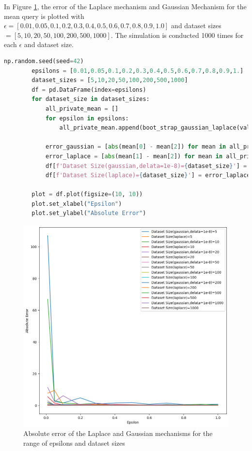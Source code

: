 \documentclass[12pt]{extarticle}
\begin{document}
	 In Figure \ref{fig:fig10}, the error of the Laplace mechanism and Gaussian Mechanism for the mean query is plotted with $\epsilon = [0.01, 0.05, 0.1, 0.2, 0.3, 0.4, 0.5, 0.6, 0.7, 0.8, 0.9, 1.0]$ and dataset sizes $=[5, 10, 20, 50, 100, 200, 500, 1000]$. The simulation is conducted 1000 times for each $\epsilon$ and dataset size.
	 \begin{lstlisting}[language=Python]
	 	np.random.seed(seed=42)
	 	epsilons = [0.01,0.05,0.1,0.2,0.3,0.4,0.5,0.6,0.7,0.8,0.9,1.]
	 	dataset_sizes = [5,10,20,50,100,200,500,1000]
	 	df = pd.DataFrame(index=epsilons)
	 	for dataset_size in dataset_sizes:
	 		all_private_mean = []
		 	for epsilon in epsilons:
		 		all_private_mean.append(boot_strap_gaussian_laplace(val,pmf,epsilon,dataset_size,simulation_number=1000))
		 	
		 	error_gaussian = [abs(mean[0] - mean[2]) for mean in all_private_mean]
		 	error_laplace = [abs(mean[1] - mean[2]) for mean in all_private_mean]
		 	df[f'Dataset Size(gaussian,delata=1e-8)={dataset_size}'] = error_gaussian
		 	df[f'Dataset Size(laplace)={dataset_size}'] = error_laplace
	 	
	 	plot = df.plot(figsize=(10, 10))
	 	plot.set_xlabel("Epsilon")
	 	plot.set_ylabel("Absolute Error")
	 \end{lstlisting}
	\begin{figure}[h]
	\centering
	\includegraphics[width=1\textwidth]{im10.png}
	\caption{Absolute error of the Laplace and Gaussian mechanisms for the range of epsilons and dataset sizes}
	\label{fig:fig10}
	\end{figure}
	
	\FloatBarrier
	
	

	
	
	
   
\end{document}
